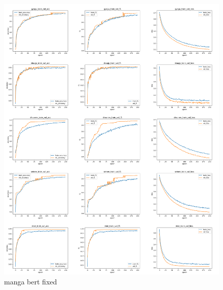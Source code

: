 \documentclass[twocolumn]{jarticle}     %
\begin{document}
\clearpage
\begin{figure}[h]
  \begin{center} %
    \includegraphics[width=14.0cm]{bert_fixed.png}
    \caption{manga bert fixed} %
    \label{fig:manga_bert_fixed} %
  \end{center}
\end{figure}
\end{document}
